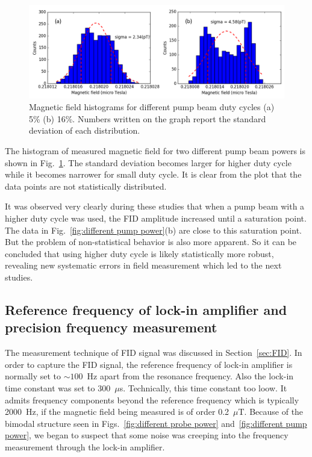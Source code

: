 \begin{figure}
  \centering
  \includegraphics[width=\textwidth]{figures/pump_beam}
  \caption{Magnetic field histograms for different pump beam duty
    cycles (a) 5\% (b) 16\%.  Numbers written on the graph report the
    standard deviation of each distribution.}
    \label{fig:different pump power}
\end{figure}

The histogram of measured magnetic field for two different pump beam
powers is shown in Fig.~\ref{fig:different pump power}. The standard
deviation becomes larger for higher duty cycle while it becomes
narrower for small duty cycle.  It is clear from the plot that the
data points are not statistically distributed.  

It was observed very clearly during these studies that when a pump
beam with a higher duty cycle was used, the FID amplitude increased
until a saturation point.  The data in Fig.~\ref{fig:different pump
  power}(b) are close to this saturation point.  But the problem of
non-statistical behavior is also more apparent.  So it can be
concluded that using higher duty cycle is likely statistically more
robust, revealing new systematic errors in field measurement which led
to the next studies.

\subsection{Reference frequency of lock-in amplifier and precision frequency measurement}

The measurement technique of FID signal was discussed in
Section~\ref{sec:FID}.  In order to capture the FID signal, the
reference frequency of lock-in amplifier is normally set to $\sim
100$~Hz apart from the resonance frequency.  Also the lock-in time
constant was set to 300~$\mu$s.  Technically, this time constant too
loow.  It admits frequency components beyond the reference frequency
which is typically 2000~Hz, if the magnetic field being measured is of
order 0.2~$\mu$T.  Because of the bimodal structure seen in
Figs.~\ref{fig:different probe power} and~\ref{fig:different pump
  power}, we began to suspect that some noise was creeping into the
frequency measurement through the lock-in amplifier.


